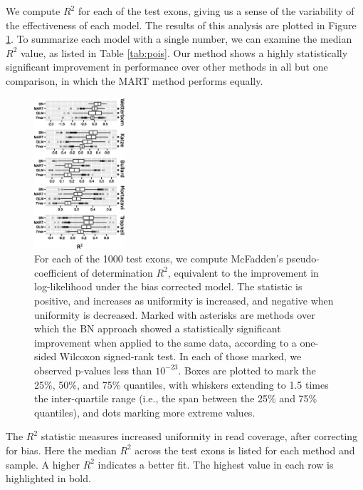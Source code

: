 \documentclass{bioinfo}
\begin{document}
We compute $R^2$ for each of the test exons, giving us a sense of the variability
of the effectiveness of each model. The results of this analysis are plotted in
Figure \ref{fig:pois}.  To summarize each model with a single number, we can
examine the median $R^2$ value, as listed in Table \ref{tab:pois}. Our method
shows a highly statistically significant improvement in performance over other
methods in all but one comparison, in which the MART method performs equally.

\begin{figure}
\centerline{\includegraphics[width=0.30\textwidth]{pois-boxplot.eps}}
\caption{For each of the 1000 test exons, we compute McFadden's pseudo-coefficient of
determination $R^2$, equivalent to the improvement in log-likelihood under the
bias corrected model. The statistic is positive, and increases as uniformity is
increased, and negative when uniformity is decreased.  Marked with asterisks are
methods over which the BN approach showed a statistically significant improvement
when applied to the same data, according to a one-sided Wilcoxon signed-rank
test. In each of those marked, we observed p-values less than $10^{-23}$.  Boxes
are plotted to mark the 25\%, 50\%, and 75\% quantiles, with whiskers extending
to 1.5 times the inter-quartile range (i.e., the span between the 25\% and 75\%
quantiles), and dots marking more extreme values.
}
    \label{fig:pois}
\end{figure}


\begin{table}
{
    The $R^2$ statistic measures increased uniformity in read coverage, after
    correcting for bias.  Here the median $R^2$ across the test exons is listed
    for each method and sample. A higher $R^2$ indicates a better fit. The
    highest value in each row is highlighted in bold.
}
\end{table}
\end{document}
